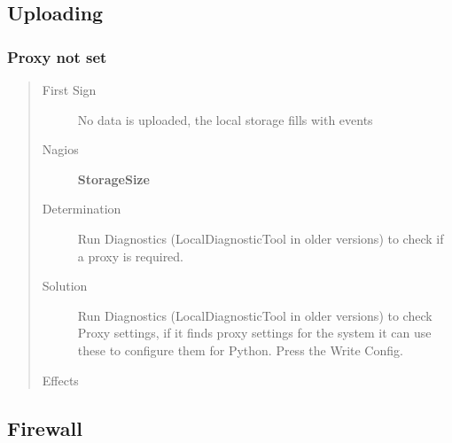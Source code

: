 \documentclass[a4paper,11pt,english]{sphinxmanual}
\begin{document}
\subsection{Uploading}
\label{known-issues:uploading}

\subsubsection{Proxy not set}
\label{known-issues:proxy-not-set}\begin{quote}\begin{description}
\item[{First Sign}] \leavevmode
No data is uploaded, the local storage fills with events

\item[{Nagios}] \leavevmode
\textbf{StorageSize}

\item[{Determination}] \leavevmode
Run Diagnostics (LocalDiagnosticTool in older versions) to check if a proxy is required.

\item[{Solution}] \leavevmode
Run Diagnostics (LocalDiagnosticTool in older versions) to check Proxy settings, if it finds proxy settings for the system it can use these to configure them for Python. Press the Write Config.

\item[{Effects}] \leavevmode
\end{description}\end{quote}


\subsection{Firewall}
\label{known-issues:firewall}
\end{document}
